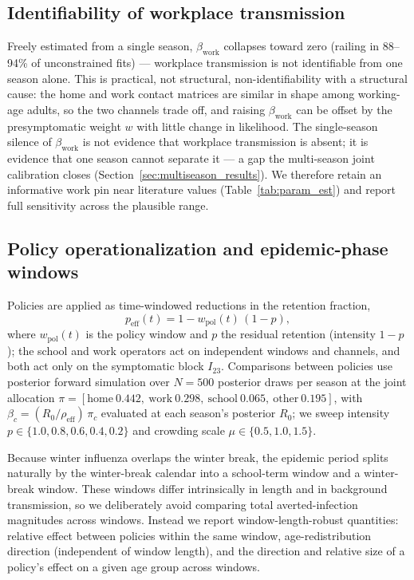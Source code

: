 \documentclass[12pt]{article}
\theoremstyle{plain}
\theoremstyle{remark}
\theoremstyle{definition}
\begin{document}
\subsection{Identifiability of workplace transmission}
\label{sec:ident}
Freely estimated from a single season, $\beta_{\mathrm{work}}$ collapses toward zero (railing in 88--94\% of unconstrained fits) --- workplace transmission is not identifiable from one season alone. This is practical, not structural, non-identifiability with a structural cause: the home and work contact matrices are similar in shape among working-age adults, so the two channels trade off, and raising $\beta_{\mathrm{work}}$ can be offset by the presymptomatic weight $w$ with little change in likelihood. The single-season silence of $\beta_{\mathrm{work}}$ is not evidence that workplace transmission is absent; it is evidence that one season cannot separate it --- a gap the multi-season joint calibration closes (Section~\ref{sec:multiseason_results}). We therefore retain an informative work pin near literature values (Table~\ref{tab:param_est}) and report full sensitivity across the plausible range.

\subsection{Policy operationalization and epidemic-phase windows}
\label{sec:policy}
Policies are applied as time-windowed reductions in the retention fraction,
\begin{equation}
p_{\mathrm{eff}}(t) = 1 - w_{\mathrm{pol}}(t)\,(1 - p),
\end{equation}
where $w_{\mathrm{pol}}(t)$ is the policy window and $p$ the residual retention (intensity $1 - p$); the school and work operators act on independent windows and channels, and both act only on the symptomatic block $I_{23}$. Comparisons between policies use posterior forward simulation over $N = 500$ posterior draws per season at the joint allocation $\pi = [\mathrm{home}\ 0.442,\ \mathrm{work}\ 0.298,\ \mathrm{school}\ 0.065,\ \mathrm{other}\ 0.195]$, with $\beta_c = (R_0 / \rho_{\mathrm{eff}})\,\pi_c$ evaluated at each season's posterior $R_0$; we sweep intensity $p \in \{1.0, 0.8, 0.6, 0.4, 0.2\}$ and crowding scale $\mu \in \{0.5, 1.0, 1.5\}$.

Because winter influenza overlaps the winter break, the epidemic period splits naturally by the winter-break calendar into a school-term window and a winter-break window. These windows differ intrinsically in length and in background transmission, so we deliberately avoid comparing total averted-infection magnitudes across windows. Instead we report window-length-robust quantities: relative effect between policies within the same window, age-redistribution direction (independent of window length), and the direction and relative size of a policy's effect on a given age group across windows.
\end{document}
